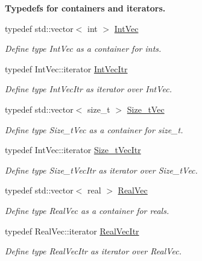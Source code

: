 \begin{Indent}{\bf \-Typedefs for containers and iterators.}\par
\begin{DoxyCompactItemize}
\item 
typedef std\-::vector$<$ int $>$ \hyperlink{namespacesubpavings_aed8e75b2af342b9c1460431c223dca8e}{\-Int\-Vec}
\begin{DoxyCompactList}\small\item\em \-Define type \-Int\-Vec as a container for ints. \end{DoxyCompactList}\item 
typedef \-Int\-Vec\-::iterator \hyperlink{namespacesubpavings_ac37614ffc671c9e95013493ff9dc5137}{\-Int\-Vec\-Itr}
\begin{DoxyCompactList}\small\item\em \-Define type \-Int\-Vec\-Itr as iterator over \-Int\-Vec. \end{DoxyCompactList}\item 
typedef std\-::vector$<$ size\-\_\-t $>$ \hyperlink{namespacesubpavings_a612fc5639b45583b9fd33bd304354f81}{\-Size\-\_\-t\-Vec}
\begin{DoxyCompactList}\small\item\em \-Define type \-Size\-\_\-t\-Vec as a container for size\-\_\-t. \end{DoxyCompactList}\item 
typedef \-Int\-Vec\-::iterator \hyperlink{namespacesubpavings_a764c7dafc0022ded276050b8cd056904}{\-Size\-\_\-t\-Vec\-Itr}
\begin{DoxyCompactList}\small\item\em \-Define type \-Size\-\_\-t\-Vec\-Itr as iterator over \-Size\-\_\-t\-Vec. \end{DoxyCompactList}\item 
typedef std\-::vector$<$ real $>$ \hyperlink{namespacesubpavings_af2d57bb6e12f4a73169f2e496d6a641f}{\-Real\-Vec}
\begin{DoxyCompactList}\small\item\em \-Define type \-Real\-Vec as a container for reals. \end{DoxyCompactList}\item 
typedef \-Real\-Vec\-::iterator \hyperlink{namespacesubpavings_aca205cec2a67bee00aee408d0cc6f3a1}{\-Real\-Vec\-Itr}
\begin{DoxyCompactList}\small\item\em \-Define type \-Real\-Vec\-Itr as iterator over \-Real\-Vec. \end{DoxyCompactList}\item 

\end{DoxyCompactItemize}
\end{Indent}
